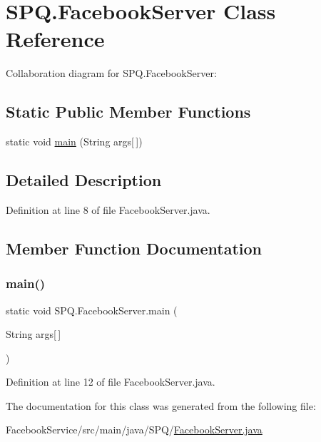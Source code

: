 \hypertarget{class_s_p_q_1_1_facebook_server}{}\section{S\+P\+Q.\+Facebook\+Server Class Reference}
\label{class_s_p_q_1_1_facebook_server}


Collaboration diagram for S\+P\+Q.\+Facebook\+Server\+:
\subsection*{Static Public Member Functions}
\begin{DoxyCompactItemize}
\item 
static void \mbox{\hyperlink{class_s_p_q_1_1_facebook_server_aa8376542eaad78cc8894afbcc1dfc205}{main}} (String args\mbox{[}$\,$\mbox{]})
\end{DoxyCompactItemize}


\subsection{Detailed Description}


Definition at line 8 of file Facebook\+Server.\+java.



\subsection{Member Function Documentation}
\mbox{\label{class_s_p_q_1_1_facebook_server_aa8376542eaad78cc8894afbcc1dfc205}} 
\subsubsection{\texorpdfstring{main()}{main()}}
{\footnotesize\ttfamily static void S\+P\+Q.\+Facebook\+Server.\+main (\begin{DoxyParamCaption}\item[{String}]{args\mbox{[}$\,$\mbox{]} }\end{DoxyParamCaption})\hspace{0.3cm}{\ttfamily [static]}}



Definition at line 12 of file Facebook\+Server.\+java.



The documentation for this class was generated from the following file\+:\begin{DoxyCompactItemize}
\item 
Facebook\+Service/src/main/java/\+S\+P\+Q/\mbox{\hyperlink{_facebook_server_8java}{Facebook\+Server.\+java}}\end{DoxyCompactItemize}
